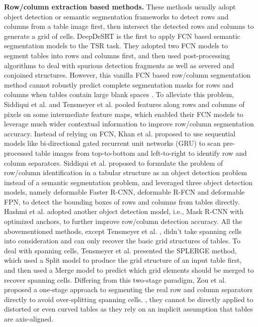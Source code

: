 \documentclass[final,3p,times,twocolumn]{elsarticle}
\begin{document}
\textbf{Row/column extraction based methods.} These methods usually adopt object detection or semantic segmentation frameworks to detect rows and columns from a table image first, then intersect the detected rows and columns to generate a grid of cells. DeepDeSRT \cite{schreiber2017deepdesrt} is the first to apply FCN based semantic segmentation models to the TSR task. They adopted two FCN models to segment tables into rows and columns first, and then used post-processing algorithms to deal with spurious detection fragments as well as severed and conjoined structures. However, this vanilla FCN based row/column segmentation method cannot robustly predict complete segmentation masks for rows and columns when tables contain large blank spaces \cite{siddiqui2019rethinking,tensmeyer2019deep}. To alleviate this problem, Siddiqui et al. \cite{siddiqui2019rethinking} and Tensmeyer et al. \cite{tensmeyer2019deep} pooled features along rows and columns of pixels on some intermediate feature maps, which enabled their FCN models to leverage much wider contextual information to improve row/column segmentation accuracy. Instead of relying on FCN, Khan et al. \cite{khan2019table} proposed to use sequential models like bi-directional gated recurrent unit networks (GRU) to scan pre-processed table images from top-to-bottom and left-to-right to identify row and column separators. Siddiqui et al. \cite{siddiqui2019deeptabstr} proposed to formulate the problem of row/column identification in a tabular structure as an object detection problem instead of a semantic segmentation problem, and leveraged three object detection models, namely deformable Faster R-CNN, deformable R-FCN and deformable FPN, to detect the bounding boxes of rows and columns from tables directly. Hashmi et al. \cite{hashmi2021guided} adopted another object detection model, i.e., Mask R-CNN with optimized anchors, to further improve row/column detection accuracy. All the abovementioned methods, except Tensmeyer et al. \cite{tensmeyer2019deep}, didn’t take spanning cells into consideration and can only recover the basic grid structures of tables. To deal with spanning cells, Tensmeyer et al. \cite{tensmeyer2019deep} presented the SPLERGE method, which used a Split model to produce the grid structure of an input table first, and then used a Merge model to predict which grid elements should be merged to recover spanning cells. Differing from this two-stage paradigm, Zou et al. \cite{zou2020deep} proposed a one-stage approach to segmenting the real row and column separators directly to avoid over-splitting spanning cells. {}, they cannot be directly applied to distorted or even curved tables as they rely on an implicit assumption that tables are axis-aligned.
\end{document}
